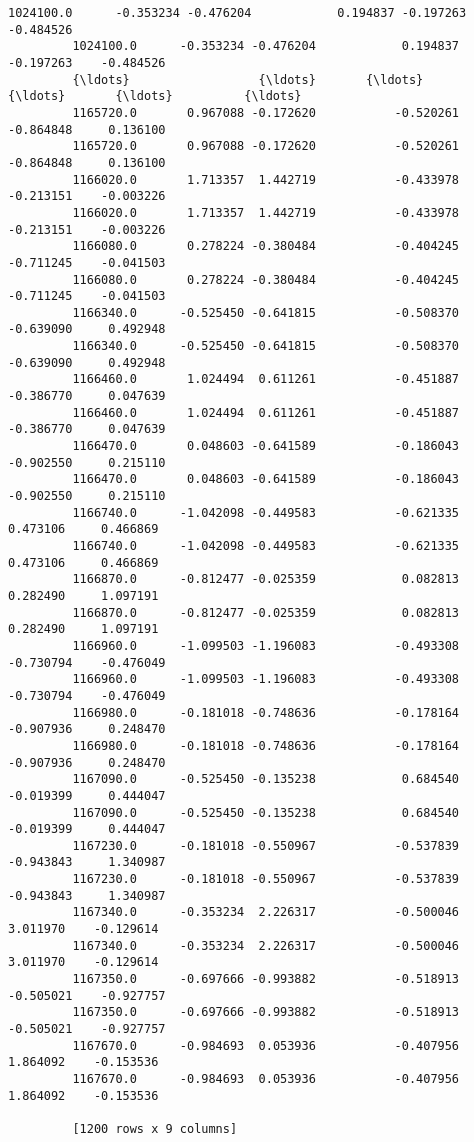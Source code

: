 \documentclass[11pt]{article}
\begin{document}
\begin{Verbatim}[commandchars=\\\{\}]
         1024100.0      -0.353234 -0.476204            0.194837 -0.197263    -0.484526  
         1024100.0      -0.353234 -0.476204            0.194837 -0.197263    -0.484526  
         {\ldots}                  {\ldots}       {\ldots}                 {\ldots}       {\ldots}          {\ldots}  
         1165720.0       0.967088 -0.172620           -0.520261 -0.864848     0.136100  
         1165720.0       0.967088 -0.172620           -0.520261 -0.864848     0.136100  
         1166020.0       1.713357  1.442719           -0.433978 -0.213151    -0.003226  
         1166020.0       1.713357  1.442719           -0.433978 -0.213151    -0.003226  
         1166080.0       0.278224 -0.380484           -0.404245 -0.711245    -0.041503  
         1166080.0       0.278224 -0.380484           -0.404245 -0.711245    -0.041503  
         1166340.0      -0.525450 -0.641815           -0.508370 -0.639090     0.492948  
         1166340.0      -0.525450 -0.641815           -0.508370 -0.639090     0.492948  
         1166460.0       1.024494  0.611261           -0.451887 -0.386770     0.047639  
         1166460.0       1.024494  0.611261           -0.451887 -0.386770     0.047639  
         1166470.0       0.048603 -0.641589           -0.186043 -0.902550     0.215110  
         1166470.0       0.048603 -0.641589           -0.186043 -0.902550     0.215110  
         1166740.0      -1.042098 -0.449583           -0.621335  0.473106     0.466869  
         1166740.0      -1.042098 -0.449583           -0.621335  0.473106     0.466869  
         1166870.0      -0.812477 -0.025359            0.082813  0.282490     1.097191  
         1166870.0      -0.812477 -0.025359            0.082813  0.282490     1.097191  
         1166960.0      -1.099503 -1.196083           -0.493308 -0.730794    -0.476049  
         1166960.0      -1.099503 -1.196083           -0.493308 -0.730794    -0.476049  
         1166980.0      -0.181018 -0.748636           -0.178164 -0.907936     0.248470  
         1166980.0      -0.181018 -0.748636           -0.178164 -0.907936     0.248470  
         1167090.0      -0.525450 -0.135238            0.684540 -0.019399     0.444047  
         1167090.0      -0.525450 -0.135238            0.684540 -0.019399     0.444047  
         1167230.0      -0.181018 -0.550967           -0.537839 -0.943843     1.340987  
         1167230.0      -0.181018 -0.550967           -0.537839 -0.943843     1.340987  
         1167340.0      -0.353234  2.226317           -0.500046  3.011970    -0.129614  
         1167340.0      -0.353234  2.226317           -0.500046  3.011970    -0.129614  
         1167350.0      -0.697666 -0.993882           -0.518913 -0.505021    -0.927757  
         1167350.0      -0.697666 -0.993882           -0.518913 -0.505021    -0.927757  
         1167670.0      -0.984693  0.053936           -0.407956  1.864092    -0.153536  
         1167670.0      -0.984693  0.053936           -0.407956  1.864092    -0.153536  
         
         [1200 rows x 9 columns]
\end{Verbatim}
            
\end{document}

